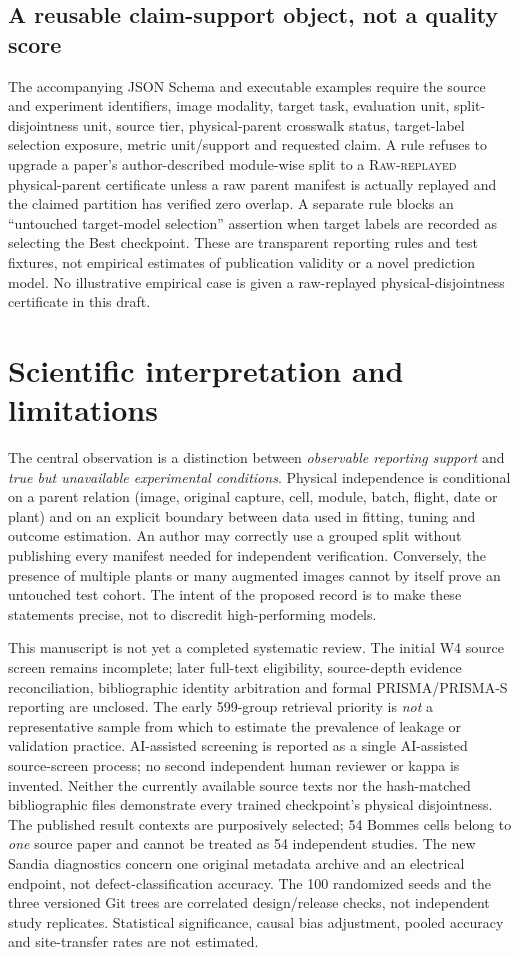 \documentclass[10pt,a4paper]{article}
\newcommand{\raw}{\textsc{Raw-replayed}}
\begin{document}
\subsection{A reusable claim-support object, not a quality score}
The accompanying JSON Schema and executable examples require the source and experiment identifiers, image modality, target task, evaluation unit, split-disjointness unit, source tier, physical-parent crosswalk status, target-label selection exposure, metric unit/support and requested claim. A rule refuses to upgrade a paper's author-described module-wise split to a \raw{} physical-parent certificate unless a raw parent manifest is actually replayed and the claimed partition has verified zero overlap. A separate rule blocks an ``untouched target-model selection'' assertion when target labels are recorded as selecting the Best checkpoint. These are transparent reporting rules and test fixtures, not empirical estimates of publication validity or a novel prediction model. No illustrative empirical case is given a raw-replayed physical-disjointness certificate in this draft.

\section{Scientific interpretation and limitations}
The central observation is a distinction between \emph{observable reporting support} and \emph{true but unavailable experimental conditions}. Physical independence is conditional on a parent relation (image, original capture, cell, module, batch, flight, date or plant) and on an explicit boundary between data used in fitting, tuning and outcome estimation. An author may correctly use a grouped split without publishing every manifest needed for independent verification. Conversely, the presence of multiple plants or many augmented images cannot by itself prove an untouched test cohort. The intent of the proposed record is to make these statements precise, not to discredit high-performing models.

This manuscript is not yet a completed systematic review. The initial W4 source screen remains incomplete; later full-text eligibility, source-depth evidence reconciliation, bibliographic identity arbitration and formal PRISMA/PRISMA-S reporting are unclosed. The early 599-group retrieval priority is \emph{not} a representative sample from which to estimate the prevalence of leakage or validation practice. AI-assisted screening is reported as a single AI-assisted source-screen process; no second independent human reviewer or kappa is invented. Neither the currently available source texts nor the hash-matched bibliographic files demonstrate every trained checkpoint's physical disjointness. The published result contexts are purposively selected; 54 Bommes cells belong to \emph{one} source paper and cannot be treated as 54 independent studies. The new Sandia diagnostics concern one original metadata archive and an electrical endpoint, not defect-classification accuracy. The 100 randomized seeds and the three versioned Git trees are correlated design/release checks, not independent study replicates. Statistical significance, causal bias adjustment, pooled accuracy and site-transfer rates are not estimated.
\end{document}
